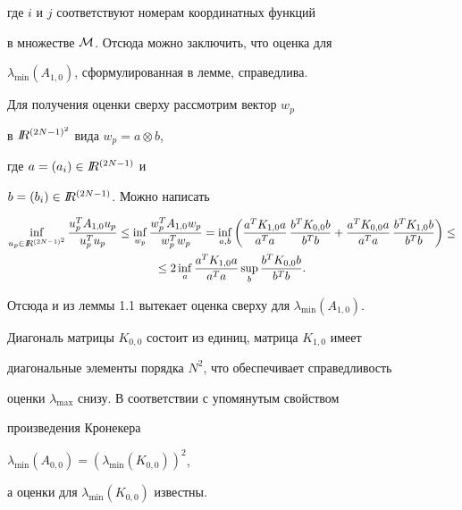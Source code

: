 \begin{pf}
\begin{equation}
\end{equation}


где $i$ и $j$ соответствуют номерам координатных функций


в множестве $\cal M$. Отсюда можно заключить, что оценка для


$\lambda_{\min}(A_{1,0})$, сформулированная в лемме, справедлива.


Для получения оценки сверху рассмотрим вектор $w_p$


в $I\!\!R^{(2N-1)^2}$ вида $w_p=a\otimes b$,


где $a=(a_i)\in I\!\!R^{(2N-1)}$ и


$b=(b_i)\in I\!\!R^{(2N-1)}$. Можно написать


\begin{multline}


\label{my26}


\inf\limits_{u_p\in\RR^{(2N-1)^2}}


\frac{u_p^T A_{1,0}u_p}{u_p^T u_p }\le


\inf\limits_{w_p}\frac{w_p^T A_{1,0}w_p}{w_p^T w_p}=


\inf\limits_{a,b}


\bigg(\frac{a^T K_{1,0}a}{a^T a}\,\frac{b^T K_{0,0}b}{b^T b}


+\frac{a^T K_{0,0}a}{a^T a}\,\frac{b^T K_{1,0}b}{b^T b}\bigg)\le\\


\le2\inf\limits_a\frac{a^T K_{1,0}a}{a^T a}


\sup\limits_b\frac{b^T K_{0,0}b}{b^T b}.


\end{multline}


Отсюда и из леммы 1.1 вытекает оценка сверху для $\lambda_{\min}(A_{1,0})$.


Диагональ матрицы $K_{0,0}$ состоит из единиц, матрица $K_{1,0}$ имеет


диагональные элементы порядка $N^2$, что обеспечивает справедливость


оценки $\lambda_{\max}$ снизу. В соответствии с упомянутым свойством


произведения Кронекера


$\lambda_{\min}(A_{0,0})=(\lambda_{\min}(K_{0,0}))^2$,


а оценки для $\lambda_{\min}(K_{0,0})$ известны.


\end{pf}





